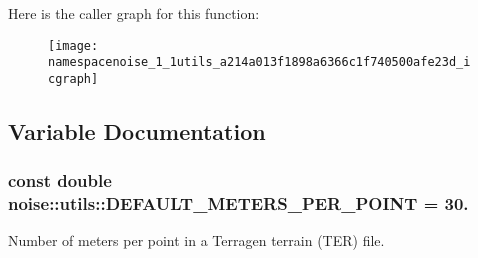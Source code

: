 Here is the caller graph for this function\+:\nopagebreak
\begin{figure}[H]
\begin{center}
\leavevmode
\texttt{[image: namespacenoise\_1\_1utils\_a214a013f1898a6366c1f740500afe23d\_icgraph]}
\end{center}
\end{figure}




\subsection{Variable Documentation}
\hypertarget{namespacenoise_1_1utils_a3c693dbdf176e936476e321a63f24859}{
\subsubsection[{D\+E\+F\+A\+U\+L\+T\+\_\+\+M\+E\+T\+E\+R\+S\+\_\+\+P\+E\+R\+\_\+\+P\+O\+I\+N\+T}]{\setlength{\rightskip}{0pt plus 5cm}const double noise\+::utils\+::\+D\+E\+F\+A\+U\+L\+T\+\_\+\+M\+E\+T\+E\+R\+S\+\_\+\+P\+E\+R\+\_\+\+P\+O\+I\+N\+T = 30.}}\label{namespacenoise_1_1utils_a3c693dbdf176e936476e321a63f24859}


Number of meters per point in a Terragen terrain (T\+E\+R) file. 


